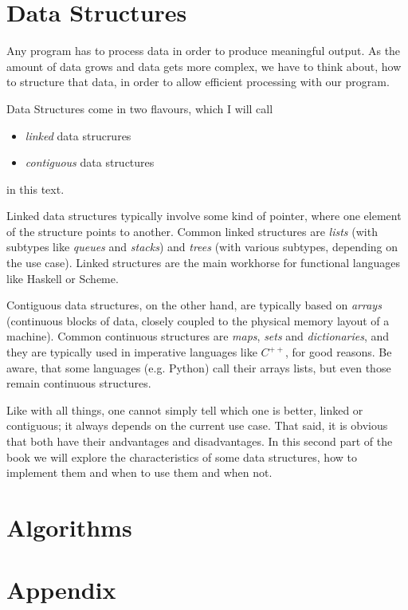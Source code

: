 \documentclass{scrbook}
\numberwithin{equation}{chapter}
\theoremstyle{definition}
\begin{document}
\part{Data Structures}

Any program has to process data in order to produce meaningful output.
As the amount of data grows and data gets more complex, we have to think about,
how to structure that data, in order to allow efficient processing with our program.

Data Structures come in two flavours, which I will call
\begin{itemize}
  \item \emph{linked} data strucrures
  \item \emph{contiguous} data structures
\end{itemize}

in this text.

Linked data structures typically involve some kind of pointer,
where one element of the structure points to another.
Common linked structures are \emph{lists} (with subtypes like \emph{queues}
and \emph{stacks}) and \emph{trees} (with various subtypes, depending on the use case).
Linked structures are the main workhorse for functional languages like
Haskell or Scheme.

Contiguous data structures, on the other hand, are typically based on \emph{arrays}
(continuous blocks of data, closely coupled to the physical memory layout of a machine).
Common continuous structures are \emph{maps}, \emph{sets} and \emph{dictionaries},
and they are typically used in imperative languages like $C^{++}$, for good reasons.
Be aware, that some languages (e.g. Python) call their arrays lists, but even those remain
continuous structures.

Like with all things, one cannot simply tell which one is better, linked or contiguous;
it always depends on the current use case.
That said, it is obvious that both have their andvantages and disadvantages.
In this second part of the book we will explore the characteristics of some data structures,
how to implement them and when to use them and when not.




\part{Algorithms}


\part{Appendix}
\appendix


\backmatter
\end{document}
